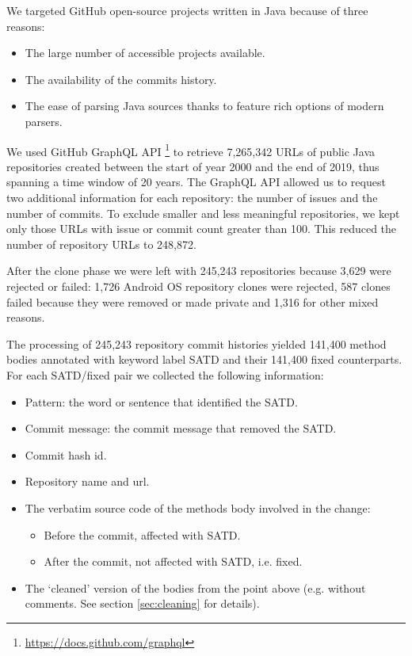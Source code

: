 We targeted GitHub open-source projects written in Java because of three reasons:
\begin{itemize}
    \item The large number of accessible projects available.
    \item The availability of the commits history. 
    \item The ease of parsing Java sources thanks to feature rich options of modern parsers.
\end{itemize}
We used GitHub GraphQL API \footnote{\url{https://docs.github.com/graphql}} to retrieve 7,265,342 URLs of public Java repositories created between the start of year 2000 and the end of 2019, thus spanning a time window of 20 years.
The GraphQL API allowed us to request two additional information for each repository: the number of issues and the number of commits. To exclude smaller and less meaningful repositories, we kept only those URLs with issue or commit count greater than 100. This reduced the number of repository URLs to 248,872.

After the clone phase we were left with 245,243 repositories because 3,629 were rejected or failed: 1,726 Android OS repository clones were rejected, 587 clones failed because they were removed or made private and 1,316 for other mixed reasons.

The processing of 245,243 repository commit histories yielded 141,400 method bodies annotated with keyword label SATD and their 141,400 fixed counterparts. For each SATD/fixed pair we collected the following information:
\begin{itemize}
    \item Pattern: the word or sentence that identified the SATD.
    \item Commit message: the commit message that removed the SATD.
    \item Commit hash id.
    \item Repository name and url.
    \item The verbatim source code of the methods body involved in the change: 
    \begin{itemize}
    \item Before the commit, affected with SATD. 
    \item After the commit, not affected with SATD, i.e. fixed.
    \end{itemize}
\item The `cleaned' version of the bodies from the point above (e.g. without comments. See section \ref{sec:cleaning} for details).
\end{itemize}

